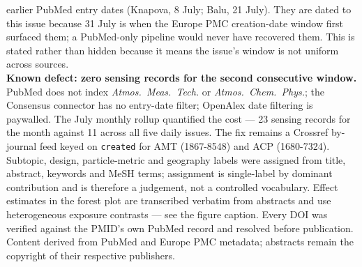 \documentclass[10pt]{article}
\begin{document}
\begin{keybox}
{earlier PubMed entry dates (Knapova, 8 July; Balu, 21 July). They are dated to this issue
because 31 July is when the Europe PMC creation-date window first surfaced them; a
PubMed-only pipeline would never have recovered them. This is stated rather than hidden
because it means the issue's window is not uniform across sources.
\\[1.0mm]
\textbf{Known defect: zero sensing records for the second consecutive window.} PubMed does
not index \textit{Atmos.\ Meas.\ Tech.} or \textit{Atmos.\ Chem.\ Phys.}; the Consensus
connector has no entry-date filter; OpenAlex date filtering is paywalled. The July
monthly rollup quantified the cost --- 23 sensing records for the month against 11 across
all five daily issues. The fix remains a Crossref by-journal feed keyed on
\texttt{created} for AMT (1867-8548) and ACP (1680-7324).
\\[1.0mm]
Subtopic, design, particle-metric and geography labels were assigned from title,
abstract, keywords and MeSH terms; assignment is single-label by dominant contribution
and is therefore a judgement, not a controlled vocabulary. Effect estimates in the forest
plot are transcribed verbatim from abstracts and use heterogeneous exposure contrasts ---
see the figure caption. Every DOI was verified against the PMID's own PubMed record and
resolved before publication. Content derived from PubMed and Europe PMC metadata;
abstracts remain the copyright of their respective publishers.\par}
\end{keybox}
\end{document}
